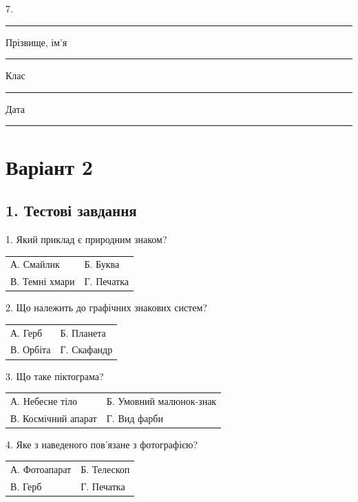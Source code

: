 \documentclass[11pt,a4paper]{article}
\begin{document}
7. \rule{0.65\linewidth}{0.4pt}\par

\newpage

Прізвище, ім'я \rule{0.65\linewidth}{0.4pt}\par

Клас \rule{0.25\linewidth}{0.4pt}    Дата \rule{0.25\linewidth}{0.4pt}\par

\section*{Варіант 2}

\subsection*{1. Тестові завдання}

\begin{minipage}{\linewidth}1. Який приклад є природним знаком?\par\begin{tabularx}{\linewidth}{@{}XX@{}}А. Смайлик & Б. Буква\\ В. Темні хмари & Г. Печатка\end{tabularx}\end{minipage}\par

\begin{minipage}{\linewidth}2. Що належить до графічних знакових систем?\par\begin{tabularx}{\linewidth}{@{}XX@{}}А. Герб & Б. Планета\\ В. Орбіта & Г. Скафандр\end{tabularx}\end{minipage}\par

\begin{minipage}{\linewidth}3. Що таке піктограма?\par\begin{tabularx}{\linewidth}{@{}XX@{}}А. Небесне тіло & Б. Умовний малюнок-знак\\ В. Космічний апарат & Г. Вид фарби\end{tabularx}\end{minipage}\par

\begin{minipage}{\linewidth}4. Яке з наведеного пов'язане з фотографією?\par\begin{tabularx}{\linewidth}{@{}XX@{}}А. Фотоапарат & Б. Телескоп\\ В. Герб & Г. Печатка\end{tabularx}\end{minipage}\par
\end{document}
